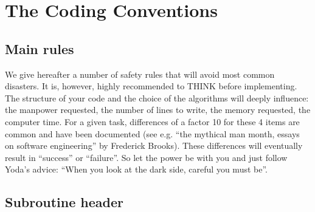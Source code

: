 \chapter{The \telemacsystem Coding Conventions}
\label{codingconv}

\section{Main rules}

We give hereafter a number of safety rules that will avoid most common
disasters. It is, however, highly recommended to THINK before implementing. The
structure of your code and the choice of the algorithms will deeply influence:
the manpower requested, the number of lines to write, the memory requested, the
computer time. For a given task, differences of a factor 10 for these 4 items
are common and have been documented (see e.g. “the mythical man month, essays
on software engineering” by Frederick Brooks). These differences will
eventually result in “success” or “failure”. So let the power be with you and
just follow Yoda’s advice: “When you look at the dark side, careful you must
be”.

\section{Subroutine header}

